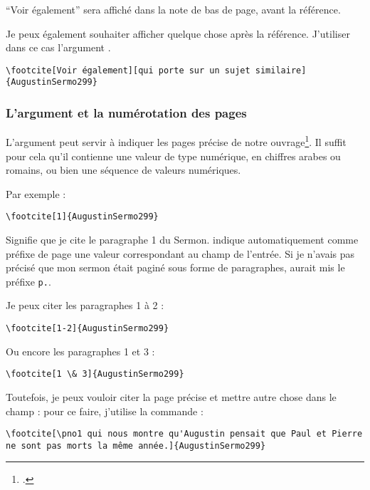 \enquote{Voir également} sera affiché dans la note de bas de page, avant la référence.

Je peux également souhaiter afficher quelque chose après la référence. J'utiliser dans ce cas l'argument .

\begin{verbatim}
\footcite[Voir également][qui porte sur un sujet similaire]{AugustinSermo299}
\end{verbatim}

\subsubsection{L'argument  et la numérotation des pages}

L'argument  peut servir à indiquer les pages précise de notre ouvrage\footcite[On consultera pour plus de détails : ][105-106]{BibLaTeX}. Il suffit pour cela qu'il contienne une valeur de type numérique, en chiffres arabes ou romains, ou bien une séquence de valeurs numériques.

Par exemple : 
\begin{verbatim}
\footcite[1]{AugustinSermo299}
\end{verbatim}

Signifie que je cite le paragraphe 1 du Sermon.  indique automatiquement comme préfixe de page une valeur correspondant au champ  de l'entrée. Si je n'avais pas précisé que mon sermon était paginé sous forme de paragraphes,  aurait mis le préfixe \verb|p.|.

Je peux citer les paragraphes 1 à 2 :

\begin{verbatim}
\footcite[1-2]{AugustinSermo299}
\end{verbatim}

Ou encore les paragraphes 1 et 3 :

\begin{verbatim}
\footcite[1 \& 3]{AugustinSermo299}
\end{verbatim}

Toutefois, je peux vouloir citer la page précise et mettre autre chose dans le champ  : pour ce faire, j'utilise la commande  :

\begin{verbatim}
\footcite[\pno1 qui nous montre qu'Augustin pensait que Paul et Pierre ne sont pas morts la même année.]{AugustinSermo299}
\end{verbatim}


